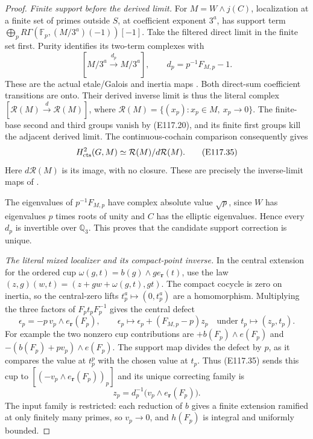 \begin{proof}
\emph{Finite support before the derived limit.}
For $M=W\wedge j(C)$, localization at a finite set of primes
outside $S$, at coefficient exponent $3^a$, has support
term $\bigoplus_p R\Gamma(\mathbb F_p,(M/3^a)(-1))[-1]$.
Take the filtered direct limit in the finite set first.
Purity identifies its two-term complexes with
\[
 [M/3^a\xrightarrow{\ d_p\ }M/3^a],\qquad
             d_p=p^{-1}F_{M,p}-1.
 \tag{E117.34}
\]
These are the actual etale/Galois and inertia maps
\cite[II.0.1(f), II.1.7(b), II.2.9]{E_MilneADT}.
Both direct-sum coefficient transitions are onto.
Their derived inverse limit is thus the literal complex
$[\mathcal R(M)\xrightarrow d\mathcal R(M)]$, where
$\mathcal R(M)=\{(x_p):x_p\in M,\ x_p\to0\}$.
The finite-base second and third groups vanish by (E117.20),
and its finite first groups kill the adjacent derived limit.
The continuous-cochain comparison consequently gives
\[
 H^2_{\rm cts}(G,M)
       \simeq\mathcal R(M)/d\mathcal R(M).
 \tag{E117.35}
\]
Here $d\mathcal R(M)$ is its image, with no closure.
These are precisely the inverse-limit maps of
\cite[Proposition1.6 and Theorem2.2]{E_JannsenContinuous}.

The eigenvalues of $p^{-1}F_{M,p}$ have complex absolute
value $\sqrt p$, since $W$ has eigenvalues $p$ times roots
of unity and $C$ has the elliptic eigenvalues.
Hence every $d_p$ is invertible over $\mathbb Q_3$.
This proves that the candidate support correction is unique.

\emph{The literal mixed localizer and its compact-point inverse.}
In the central extension for the ordered cup
$\omega(g,t)=b(g)\wedge g e_{\mathbf r}(t)$, use the law
$(z,g)(w,t)=(z+gw+\omega(g,t),gt)$.
The compact cocycle is zero on inertia, so the central-zero
lifts $t_p^a\mapsto(0,t_p^a)$ are a homomorphism.
Multiplying the three factors of $F_pt_pF_p^{-1}$ gives
the central defect
\[
 \epsilon_p=-p\,v_p\wedge e_{\mathbf r}(F_p),\qquad
 \epsilon_p\longmapsto\epsilon_p+(F_{M,p}-p)z_p
 \quad\text{under }t_p\mapsto(z_p,t_p).
 \tag{E117.36}
\]
For example the two nonzero cup contributions are
$+b(F_p)\wedge e(F_p)$ and
$-(b(F_p)+p v_p)\wedge e(F_p)$.
The support map divides the defect by $p$, as it compares
the value at $t_p^p$ with the chosen value at $t_p$.
Thus (E117.35) sends this cup to
$[(-v_p\wedge e_{\mathbf r}(F_p))_p]$ and its unique
correcting family is
\[
 z_p=d_p^{-1}\bigl(v_p\wedge e_{\mathbf r}(F_p)\bigr).
 \tag{E117.37}
\]
The input family is restricted: each reduction of $b$ gives
a finite extension ramified at only finitely many primes,
so $v_p\to0$, and $h(F_p)$ is integral and uniformly bounded.


\end{proof}
